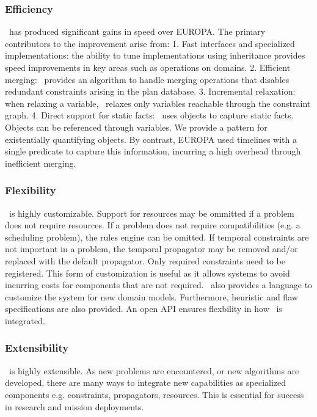 \documentclass[10pt, letterpaper, twoside]{article}
\begin{document}
\subsubsection{Efficiency} \ET\, has produced significant gains in speed over
EUROPA. The primary contributors to the improvement arise from: 1. Fast
interfaces and specialized implementations: the ability to tune
implementations using inheritance provides speed improvements in key areas
such as operations on domains.  2. Efficient merging: \ET\, provides an
algorithm to handle merging operations that disables redundant constraints
arising in the plan database. 3. Incremental relaxation: when relaxing a
variable, \ET\, relaxes only variables reachable through the constraint graph.
4. Direct support for static facts: \ET\, uses objects to capture static
facts. Objects can be referenced through variables.  We provide a pattern
for existentially quantifying objects. By contrast, EUROPA used
timelines with a single predicate to capture this information, incurring a
high overhead through inefficient merging. 

\subsubsection{Flexibility} \ET\, is highly customizable. Support for
resources may be ommitted if a problem does not require resources. If a 
problem does not require compatibilities (e.g. a scheduling problem), the
rules engine can be omitted. If temporal constraints are not important in a
problem, the temporal propagator may be removed and/or replaced with the
default propagator. Only required constraints need to be registered. This
form of customization is useful as it allows systems to avoid incurring
costs for components that are not required. \ET\, also provides a language to
customize the system for new domain models.  Furthermore, heuristic and flaw
specifications are also provided. An open API ensures flexbility in how \ET\,
is integrated.

\subsubsection{Extensibility} \ET\, is highly extensible. As new problems are
encountered, or new algorithms are developed, there are many ways to
integrate new capabilities as specialized components e.g. constraints,
propagators, resources. This is essential for success in research and
mission deployments. 
\end{document}
